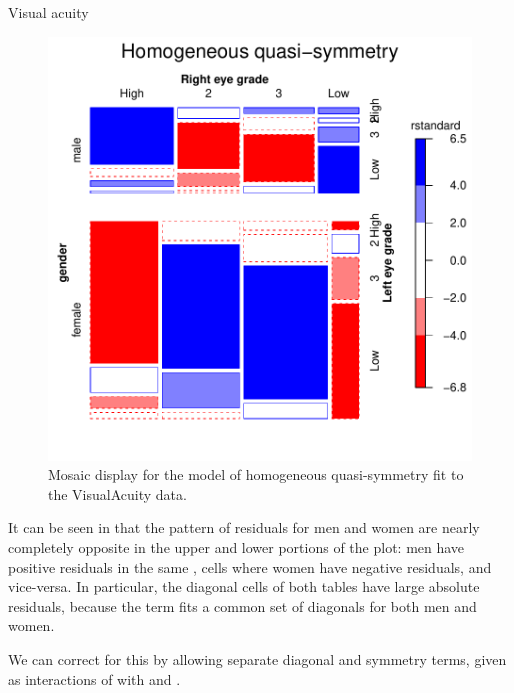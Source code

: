 \documentclass[11pt]{book}\usepackage[]{graphicx}\usepackage[]{color}
\newenvironment{knitrout}{}{} %
\renewenvironment{knitrout}{\small\renewcommand{\baselinestretch}{.85}}{} %
\begin{document}
\begin{Example}{Visual acuity}
\begin{knitrout}
\begin{figure}[!htbp]
\centerline{\includegraphics[width=.7\textwidth]{ch08/fig/vision2-qsymm-1} }

\caption[Mosaic display for the model of homogeneous quasi-symmetry fit to the VisualAcuity data]{Mosaic display for the model of homogeneous quasi-symmetry fit to the VisualAcuity data.\label{fig:vision2-qsymm}}
\end{figure}


\end{knitrout}
It can be seen in  that the pattern of residuals for men and women are nearly completely opposite
in the upper and lower portions of the plot: men have positive residuals in the same
,  cells where women have negative residuals, and vice-versa.
In particular, the diagonal cells of both tables have large absolute residuals, because
the term  fits a common set of diagonals for both men and women.

We can correct for this by allowing separate diagonal and symmetry terms, given
as interactions of  with  and .


\end{Example}
\end{document}
